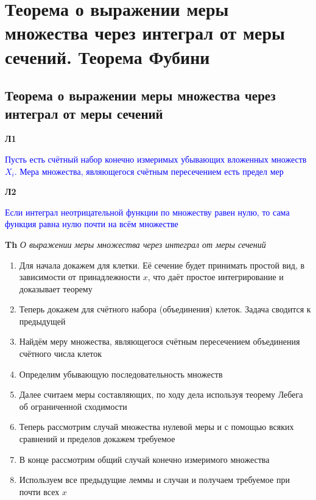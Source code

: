 \documentclass[a4paper, 14pt]{article}
\begin{document}
    
    \tableofcontents \newpage
    
    \section{Теорема о выражении меры множества через интеграл от меры сечений.
    Теорема Фубини}
    
    \subsection{Теорема о выражении меры множества через интеграл от меры сечений}
    
    \textbf{Л1}
    
    \textcolor{blue}{Пусть есть счётный набор конечно измеримых убывающих вложенных множеств $X_i$.
    Мера множества, являющегося счётным пересечением есть предел мер}
    
    \textbf{Л2}
    
    \textcolor{blue}{Если интеграл неотрицательной функции по множеству равен нулю, то сама функция равна нулю почти
    на всём множестве}
    
    \textbf{Th} \textit{О выражении меры множества через интеграл от меры сечений}
    
    \begin{enumerate}
        \item Для начала докажем для клетки.
        Её сечение будет принимать простой вид, в зависимости от принадлежности $x$, что даёт простое
        интегрирование и доказывает теорему
        \item Теперь докажем для счётного набора (объединения) клеток.
        Задача сводится к предыдущей
        \item Найдём меру множества, являющегося счётным пересечением объединения счётного числа клеток
        \item Определим убывающую последовательность множеств
        \item Далее считаем меры составляющих, по ходу дела используя теорему Лебега об ограниченной сходимости
        \item Теперь рассмотрим случай множества нулевой меры и с помощью всяких сравнений и пределов докажем требуемое
        \item В конце рассмотрим общий случай конечно измеримого множества
        \item Используем все предыдущие леммы и случаи и получаем требуемое при почти всех $x$
    \end{enumerate}
    
\end{document}
